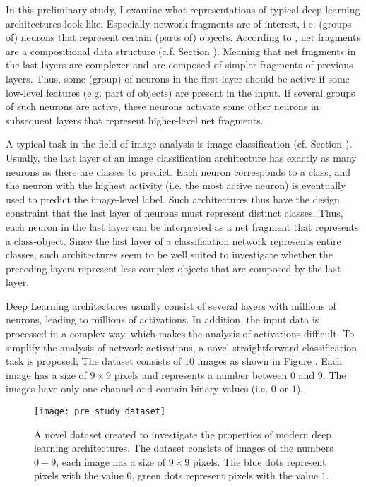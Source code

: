 In this preliminary study, I examine what representations of typical deep learning architectures look like.
Especially network fragments are of interest, i.e. (groups of) neurons that represent certain (parts of) objects.
According to , net fragments are a compositional data structure (c.f. Section ).
Meaning that net fragments in the last layers are complexer and are composed of simpler fragments of previous layers.
Thus, some (group) of neurons in the first layer should be active if some low-level features (e.g. part of objects) are present in the input.
If several groups of such neurons are active, these neurons activate some other neurons in subsequent layers that represent higher-level net fragments.

A typical task in the field of image analysis is image classification (cf. Section ).
Usually, the last layer of an image classification architecture has exactly as many neurons as there are classes to predict.
Each neuron corresponds to a class, and the neuron with the highest activity (i.e. the most active neuron) is eventually used to predict the image-level label.
Such architectures thus have the design constraint that the last layer of neurons must represent distinct classes.
Thus, each neuron in the last layer can be interpreted as a net fragment that represents a class-object.
Since the last layer of a classification network represents entire classes, such architectures seem to be well suited to investigate whether the preceding layers represent less complex objects that are composed by the last layer.

Deep Learning architectures usually consist of several layers with millions of neurons, leading to millions of activations.
In addition, the input data is processed in a complex way, which makes the analysis of activations difficult.
To simplify the analysis of network activations, a novel straightforward classification task is proposed;
The dataset consists of $10$ images as shown in Figure .
Each image has a size of $9\times9$ pixels and represents a number between $0$ and $9$.
The images have only one channel and contain binary values (i.e. $0$ or $1$).

\begin{figure}[h]
    \centering
    \texttt{[image: pre\_study\_dataset]}
    \caption[Straight Line Digits Dataset]{A novel dataset created to investigate the properties of modern deep learning architectures. The dataset consists of images of the numbers $0-9$, each image has a size of $9\times9$ pixels. The blue dots represent pixels with the value $0$, green dots represent pixels with the value $1$.}
\end{figure}

